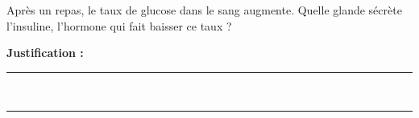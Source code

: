 Après un repas, le taux de glucose dans le sang augmente. Quelle glande sécrète l'insuline, l'hormone qui fait baisser ce taux ?

\choices

\noindent\textbf{Justification :} \hrulefill \\[2.5ex]
\rule{\linewidth}{0.4pt} \\[2.5ex]
\rule{\linewidth}{0.4pt}
\vfill
